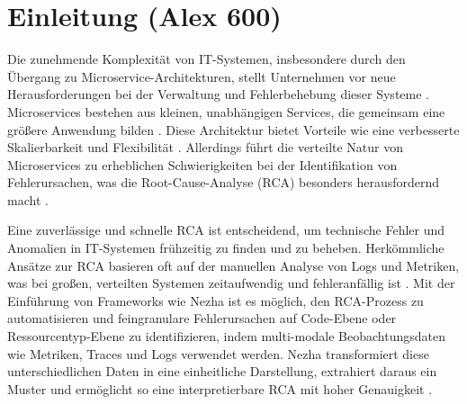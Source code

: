 


\chapter{Einleitung (Alex 600)}
\label{sec:Einleitung} %


Die zunehmende Komplexität von IT-Systemen, insbesondere durch den Übergang zu Microservice-Architekturen, stellt Unternehmen vor neue Herausforderungen bei der Verwaltung und Fehlerbehebung dieser Systeme \autocite{Newman2019}. Microservices bestehen aus kleinen, unabhängigen Services, die gemeinsam eine größere Anwendung bilden \autocite{Thones2015}. Diese Architektur bietet Vorteile wie eine verbesserte Skalierbarkeit und Flexibilität \autocite{Dragoni2017}. Allerdings führt die verteilte Natur von Microservices zu erheblichen Schwierigkeiten bei der Identifikation von Fehlerursachen, was die Root-Cause-Analyse (RCA) besonders herausfordernd macht \autocite{Pham2024}.

Eine zuverlässige und schnelle RCA ist entscheidend, um technische Fehler und Anomalien in IT-Systemen frühzeitig zu finden und zu beheben. Herkömmliche Ansätze zur RCA basieren oft auf der manuellen Analyse von Logs und Metriken, was bei großen, verteilten Systemen zeitaufwendig und fehleranfällig ist \autocite{Chen2023}. Mit der Einführung von Frameworks wie Nezha ist es möglich, den RCA-Prozess zu automatisieren und feingranulare Fehlerursachen auf Code-Ebene oder Ressourcentyp-Ebene zu identifizieren, indem multi-modale Beobachtungsdaten wie Metriken, Traces und Logs verwendet werden. Nezha transformiert diese unterschiedlichen Daten in eine einheitliche Darstellung, extrahiert daraus ein Muster und ermöglicht so eine interpretierbare RCA mit hoher Genauigkeit \autocite{nezha}.


